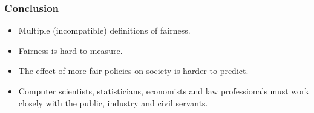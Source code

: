 \begin{frame}
  \frametitle{Conclusion}
  \begin{itemize}
  \item Multiple (incompatible) definitions of fairness.
  \item Fairness is hard to measure.
  \item The effect of more fair policies on society is harder to predict.
  \item Computer scientists, statisticians, economists and law professionals must work closely with the public, industry and civil servants.
  \end{itemize}
\end{frame}

